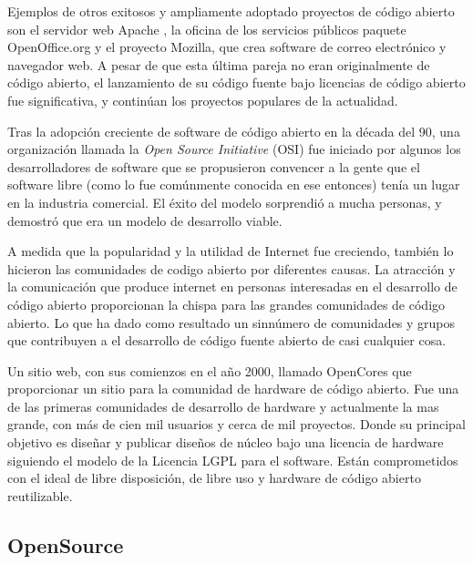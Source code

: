 	Ejemplos de otros exitosos y ampliamente adoptado proyectos de código abierto son el servidor web Apache , la oficina de los servicios públicos
	paquete OpenOffice.org y el proyecto Mozilla, que crea software de correo electrónico y navegador web. A pesar de que esta última pareja no eran
	originalmente de código abierto, el lanzamiento de su código fuente bajo licencias de código abierto fue significativa, y continúan los proyectos
	populares de la actualidad.

	Tras la adopción creciente de software de código abierto en la década del 90, una organización llamada la \textit{Open Source Initiative} (OSI) fue
	iniciado por algunos los desarrolladores de software que se propusieron convencer a la gente que el software libre (como lo fue comúnmente conocida
	en ese entonces) tenía un lugar en la industria comercial. El éxito del modelo sorprendió a mucha personas, y demostró que era un modelo de
	desarrollo viable.

	A medida que la popularidad y la utilidad de Internet fue creciendo, también lo hicieron las  comunidades de codigo abierto por diferentes causas. La
	atracción y la comunicación que produce internet en personas interesadas en el desarrollo de código abierto proporcionan la chispa para las grandes
	comunidades de código abierto. Lo que ha dado como resultado un sinnúmero de comunidades y  grupos que contribuyen a el desarrollo de código fuente
	abierto de casi cualquier cosa.

	Un sitio web, con sus comienzos en el año 2000, llamado OpenCores que proporcionar un sitio para la comunidad de hardware de código abierto. Fue una
	de las primeras comunidades de desarrollo de hardware y actualmente la mas grande, con más de cien mil usuarios y cerca de mil proyectos. Donde su
	principal objetivo es diseñar y publicar diseños de núcleo bajo una licencia de hardware siguiendo el modelo de la Licencia LGPL para el software.
	Están comprometidos con el ideal de libre disposición, de libre uso y hardware de código abierto reutilizable.\cite{Etiqueta10}

	\subsection{OpenSource}

